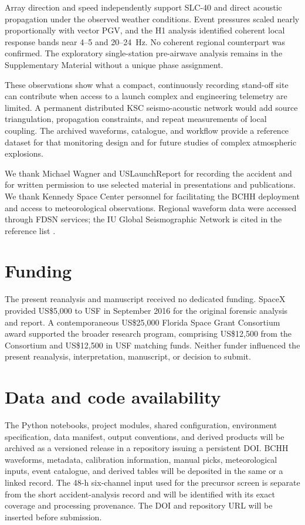 \documentclass[]{seismica}
\begin{document}
Array direction and speed independently support SLC-40 and direct acoustic
propagation under the observed weather conditions. Event pressures scaled
nearly proportionally with vector PGV, and the H1 analysis identified coherent
local response bands near 4--5 and 20--24~Hz. No coherent regional counterpart
was confirmed. The exploratory single-station pre-airwave analysis remains in
the Supplementary Material without a unique phase assignment.

These observations show what a compact, continuously recording stand-off site
can contribute when access to a launch complex and engineering telemetry are
limited. A permanent distributed KSC seismo-acoustic network would add source
triangulation, propagation constraints, and repeat measurements of local
coupling. The archived waveforms, catalogue, and workflow provide a reference
dataset for that monitoring design and for future studies of complex
atmospheric explosions.

\begin{acknowledgements}
We thank Michael Wagner and USLaunchReport for recording the accident and for
written permission to use selected material in presentations and publications.
We thank Kennedy Space Center personnel for facilitating the BCHH deployment
and access to meteorological observations. Regional waveform data were
accessed through FDSN services; the IU Global Seismographic Network is cited
in the reference list \citep{asl_gsn_iu_1988}.
\end{acknowledgements}

\section*{Funding}

The present reanalysis and manuscript received no dedicated funding. SpaceX
provided US\$5,000 to USF in September 2016 for the original forensic analysis
and report. A contemporaneous US\$25,000 Florida Space Grant Consortium award
supported the broader research program, comprising US\$12,500 from the
Consortium and US\$12,500 in USF matching funds. Neither funder influenced the
present reanalysis, interpretation, manuscript, or decision to submit.

\section*{Data and code availability}

The Python notebooks, project modules, shared configuration, environment
specification, data manifest, output conventions, and derived products will be
archived as a versioned release in a repository issuing a persistent DOI. BCHH
waveforms, metadata, calibration information, manual picks, meteorological
inputs, event catalogue, and derived tables will be deposited in the same or a
linked record. The 48-h six-channel input used for the precursor screen is
separate from the short accident-analysis record and will be identified with
its exact coverage and processing provenance. The DOI and repository URL will be inserted before submission.
\end{document}
